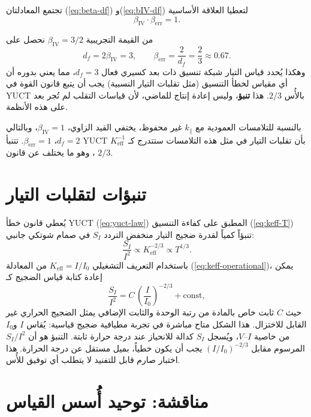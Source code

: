 \documentclass[11pt,a4paper]{article}
\newcommand{\Keff}{K_{\mathrm{eff}}}
\begin{document}
	تجتمع المعادلتان (\ref{eq:beta-df}) و(\ref{eq:bIV-df}) لتعطيا العلاقة الأساسية
	\begin{equation}
		\boxed{\beta_{\mathrm{IV}} \cdot \beta_{\mathrm{err}} = 1}.
		\label{eq:relation}
	\end{equation}
	
	من القيمة التجريبية \(\beta_{\mathrm{IV}} = 3/2\) نحصل على
	\begin{equation}
		d_f = 2\beta_{\mathrm{IV}} = 3, \qquad
		\beta_{\mathrm{err}} = \frac{2}{d_f} = \frac{2}{3} \approx 0.67.
	\end{equation}
	وهكذا يُحدد قياس التيار شبكة تنسيق ذات بعد كسيري فعال \(d_f = 3\)، مما يعني بدوره أن أي مقياس لخطأ التنسيق (مثل تقلبات التيار النسبية) يجب أن يتبع قانون القوة في YUCT بالأُس \(2/3\). هذا \textbf{تنبؤ}، وليس إعادة إنتاج للماضي، لأن قياسات التقلب لم تُجر بعد على هذه الأنظمة.
	
	بالنسبة للتلامسات العمودية مع \(k_\parallel\) غير محفوظ، يختفي القيد الزاوي، \(\beta_{\mathrm{IV}} = 1\)، وبالتالي \(d_f = 2\)، \(\beta_{\mathrm{err}} = 1\). تتنبأ YUCT بأن تقلبات التيار في مثل هذه التلامسات ستتدرج كـ \(\Keff^{-1}\)، وهو ما يختلف عن قانون \(2/3\).
	
	\section{تنبؤات لتقلبات التيار}
	\label{sec:predictions}
	يُعطي قانون خطأ YUCT (\ref{eq:yuct-law}) المطبق على كفاءة التنسيق (\ref{eq:keff-T}) تنبؤاً كمياً لقدرة ضجيج التيار منخفض التردد \(S_I\) في صمام شوتكي جانبي:
	\begin{equation}
		\frac{S_I}{I^2} \propto \Keff^{-2/3} \propto T^{1/3}.
		\label{eq:noise-pred}
	\end{equation}
	باستخدام التعريف التشغيلي \(\Keff = I/I_0\) من المعادلة (\ref{eq:keff-operational})، يمكن إعادة كتابة قياس الضجيج كـ
	\begin{equation}
		\frac{S_I}{I^2} = C \, \left(\frac{I}{I_0}\right)^{-2/3} + \text{const},
		\label{eq:noise-operational}
	\end{equation}
	حيث \(C\) ثابت خاص بالمادة من رتبة الوحدة والثابت الإضافي يمثل الضجيج الحراري غير القابل للاختزال. هذا الشكل متاح مباشرة في تجربة مطيافية ضجيج قياسية: يُقاس \(I\) و\(I_0\) من خاصية \(I\)--\(V\)، ويُسجل \(S_I\) كدالة للانحياز عند درجة حرارة ثابتة. التنبؤ هو أن \(S_I/I^2\) المرسوم مقابل \((I/I_0)^{-2/3}\) يجب أن يكون خطياً، بميل مستقل عن درجة الحرارة. هذا اختبار صارم قابل للتفنيد لا يتطلب أي توفيق للأُس.
	
	\section{مناقشة: توحيد أُسس القياس}
	
\end{document}
